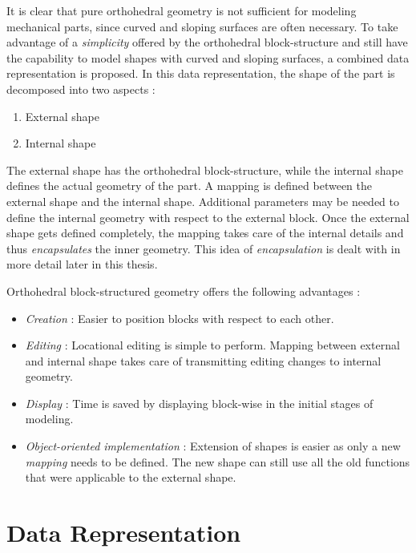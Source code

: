 	It is clear that pure orthohedral geometry is not sufficient for
	modeling mechanical parts, since curved and sloping surfaces are often 
	necessary. To take advantage of a {\em simplicity} offered by the 
	orthohedral
	block-structure and still have the capability to model shapes with curved
	and sloping surfaces, a combined data representation is proposed. In this
	data representation, the shape of the part is decomposed into two aspects :

		\begin{enumerate}
		\item
		External shape
		\item
		Internal shape
		\end{enumerate}

	The external shape has the orthohedral block-structure, while the internal
	shape defines the actual geometry of the part. A mapping is defined 
	between the external shape and the internal shape. Additional parameters 
	may be
	needed to define the internal geometry with respect to the external block.
	Once the external shape gets defined completely, the mapping takes care of 
	the
	internal details and thus {\em encapsulates} the inner geometry. This
	idea of {\em encapsulation} is dealt with in more detail later in this
	thesis.

	Orthohedral block-structured geometry offers the following advantages :

		\begin{itemize}
		\item
		{\em Creation} : Easier to position blocks with respect to each other.
		\item
		{\em Editing} : Locational editing is simple to perform. Mapping 
						between
						external and internal shape takes care of transmitting 
						editing changes to internal geometry.
		\item
		{\em Display} :	Time is saved by displaying block-wise in the initial
						stages of modeling.
		\item
		{\em Object-oriented implementation} : Extension of shapes is easier
						as only a new {\em mapping} needs to be defined. The
						new shape can still use all the old functions that
						were applicable to the external shape.
		\end{itemize}


	\section{Data Representation}
		

